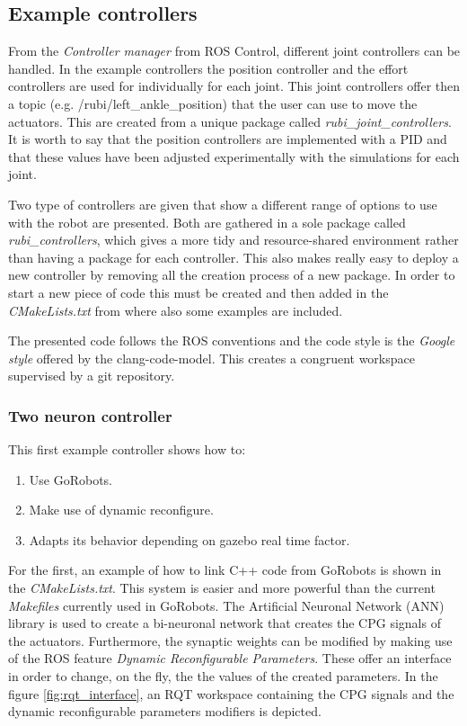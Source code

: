 
\subsection{Example controllers} %
\label{sub:example_controllers}
From the \textit{Controller manager} from ROS Control, different joint controllers can be handled.
In the example controllers the position controller and the effort controllers are used for individually for each joint.
This joint controllers offer then a topic (e.g. /rubi/left\_ankle\_position) that the user can use to move the actuators.
This are created from a unique package called \textit{rubi\_joint\_controllers}.
It is worth to say that the position controllers are implemented with a PID and that these values have been adjusted experimentally with the simulations for each joint.

Two type of controllers are given that show a different range of options to use with the robot are presented.
Both are gathered in a sole package called \textit{rubi\_controllers}, which gives a more tidy and resource-shared environment rather than having a package for each controller.
This also makes really easy to deploy a new controller by removing all the creation process of a new package.
In order to start a new piece of code this must be created and then added in the \textit{CMakeLists.txt} from where also some examples are included.

The presented code follows the ROS conventions and the code style is the \textit{Google style} offered by the clang-code-model.
This creates a congruent workspace supervised by a git repository.

\subsubsection{Two neuron controller} %
\label{ssub:two_neuron_controller}
This first example controller shows how to:
\begin{enumerate}
    \item Use GoRobots.
    \item Make use of dynamic reconfigure.
    \item Adapts its behavior depending on gazebo real time factor.
\end{enumerate}
For the first, an example of how to link C++ code from GoRobots is shown in the \textit{CMakeLists.txt}.
This system is easier and more powerful than the current \textit{Makefiles} currently used in GoRobots.
The Artificial Neuronal Network (ANN) library is used to create a bi-neuronal network that creates the CPG signals of the actuators.
Furthermore, the synaptic weights can be modified by making use of the ROS feature \textit{Dynamic Reconfigurable Parameters}.
These offer an interface in order to change, on the fly, the the values of the created parameters.
In the figure \ref{fig:rqt_interface}, an RQT workspace containing the CPG signals and the dynamic reconfigurable parameters modifiers is depicted.

